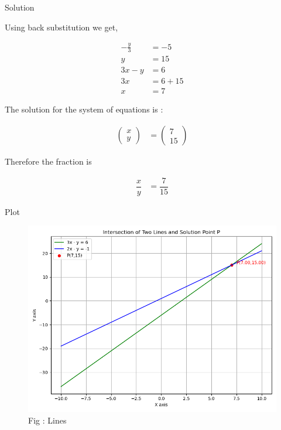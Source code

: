 \documentclass{beamer}
\numberwithin{equation}{section}
\theoremstyle{remark}
\newcommand{\myvec}[1]{\ensuremath{\begin{pmatrix}#1\end{pmatrix}}}
\begin{document}
\begin{frame}{Solution}

Using back substitution we get,

\begin{align}
  -\tfrac{y}{3} &= -5\\
  y &= 15\\
3x-y &= 6\\
  3x &= 6 + 15\\
  x &= 7
\end{align}

The solution for the system of equations is :

\begin{align}
  \myvec{x\\y} &= \myvec{7\\15}
\end{align}

Therefore the fraction is 

\begin{align}
  \dfrac{x}{y} &= \dfrac{7}{15}
\end{align}

\end{frame}

\begin{frame}{Plot}

\begin{figure}[h!]
  \centering
  \includegraphics[width=0.7\columnwidth]{figs/solution.png} 
   \caption*{Fig : Lines}
  \label{Fig1}
\end{figure}

\end{frame}
\end{document}
